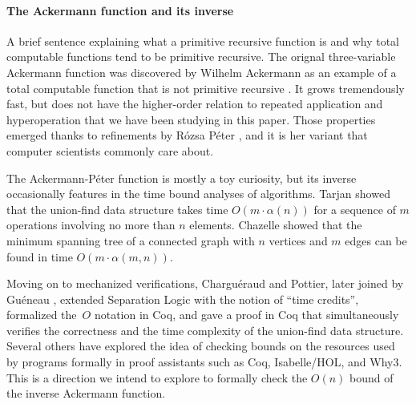 \paragraph*{The Ackermann function and its inverse}
{\color{magenta}A brief sentence explaining what a primitive recursive function is and 
why total computable functions tend to be primitive recursive.}
The orignal three-variable Ackermann function was discovered by 
Wilhelm Ackermann as an example of a total computable function that 
is not primitive recursive \cite{ackermann}. 
It grows tremendously fast, but does not have the higher-order
relation to repeated application and hyperoperation that we have been studying in
this paper. Those properties emerged thanks to refinements by Rózsa Péter \cite{peter},
and it is her variant that computer scientists commonly care about.

The Ackermann-Péter function is mostly a toy curiosity, but its inverse 
occasionally features in the time bound analyses of algorithms. 
Tarjan \cite{tarjan} showed that the union-find data structure
takes time $O(m\cdot\alpha(n))$ for a sequence of $m$ operations
involving no more than $n$ elements. 
Chazelle \cite{chazelle} showed that the minimum spanning tree
of a connected graph with $n$ vertices and $m$ edges 
can be found in time $O(m\cdot\alpha(m,n))$.

Moving on to mechanized verifications, Charguéraud and Pottier,
\cite{charpott} later joined by Guéneau \cite{gueneauetal}, 
extended Separation Logic with the notion of ``time credits'',
formalized the~$O$ notation in Coq, 
and gave a proof in Coq that simultaneously verifies the correctness
and the time complexity of the union-find data structure. Several others 
\cite{others2, others4, others3, others1} 
have explored the idea of checking bounds on the resources
used by programs formally in proof assistants such as Coq, Isabelle/HOL, and Why3.
{\color{magenta}This is a direction
we intend to explore to formally check the $O(n)$ bound
of the inverse Ackermann function.}

